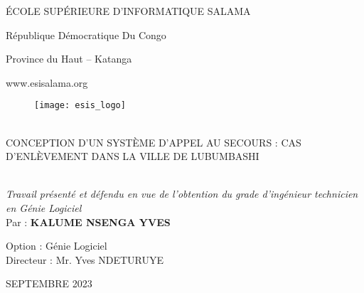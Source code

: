\begin{titlepage}
	\begin{center}
		\Large
		ÉCOLE SUPÉRIEURE D’INFORMATIQUE SALAMA
		
		\vspace{1.25pt}
		\normalfont
		République Démocratique Du Congo
		
		Province du Haut – Katanga
		
		www.esisalama.org
		
		\vspace{0.5cm}
		
		\begin{figure}[h]
			\texttt{[image: esis\_logo]}
			\centering
		\end{figure}
		
		\vspace{0.5cm}
		\hrulefill\\[0.5cm]
		CONCEPTION D'UN SYSTÈME D’APPEL AU SECOURS : CAS D'ENLÈVEMENT DANS LA VILLE DE LUBUMBASHI\\
		\hrulefill\\[1cm]
		
		\vspace{0.5cm}		
		\hfill
		\begin{minipage}{0.5\textwidth}
			\large
			
			\textit{Travail présenté et défendu en vue de l’obtention du grade d’ingénieur technicien en Génie Logiciel}\\
			
			Par : \textbf{KALUME NSENGA YVES}
			
			Option : Génie Logiciel\\
			
			Directeur : Mr. Yves NDETURUYE
		\end{minipage}
		
		\vfill
		\large
		SEPTEMBRE 2023
	\end{center}
\end{titlepage}